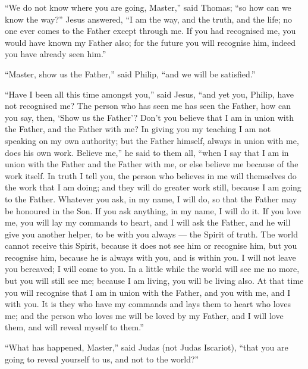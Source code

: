  ``We do not know where you are going, Master,'' said
Thomas; ``so how can we know the way?''  Jesus answered, ``I
am the way, and the truth, and the life; no one ever comes to the Father
except through me.  If you had recognised me, you would have
known my Father also; for the future you will recognise him, indeed you
have already seen him.''

 ``Master, show us the Father,'' said Philip, ``and we will
be satisfied.''

 ``Have I been all this time amongst you,'' said Jesus,
``and yet you, Philip, have not recognised me? The person who has seen
me has seen the Father, how can you say, then, `Show us the Father'?
 Don't you believe that I am in union with the Father, and
the Father with me? In giving you my teaching I am not speaking on my
own authority; but the Father himself, always in union with me, does his
own work.  Believe me,'' he said to them all, ``when I say
that I am in union with the Father and the Father with me, or else
believe me because of the work itself.  In truth I tell
you, the person who believes in me will themselves do the work that I am
doing; and they will do greater work still, because I am going to the
Father.  Whatever you ask, in my name, I will do, so that
the Father may be honoured in the Son.  If you ask
anything, in my name, I will do it.  If you love me, you
will lay my commands to heart,  and I will ask the Father,
and he will give you another helper, to be with you always --- the
Spirit of truth.  The world cannot receive this Spirit,
because it does not see him or recognise him, but you recognise him,
because he is always with you, and is within you.  I will
not leave you bereaved; I will come to you.  In a little
while the world will see me no more, but you will still see me; because
I am living, you will be living also.  At that time you
will recognise that I am in union with the Father, and you with me, and
I with you.  It is they who have my commands and lays them
to heart who loves me; and the person who loves me will be loved by my
Father, and I will love them, and will reveal myself to them.''

 ``What has happened, Master,'' said Judas (not Judas
Iscariot), ``that you are going to reveal yourself to us, and not to the
world?''

